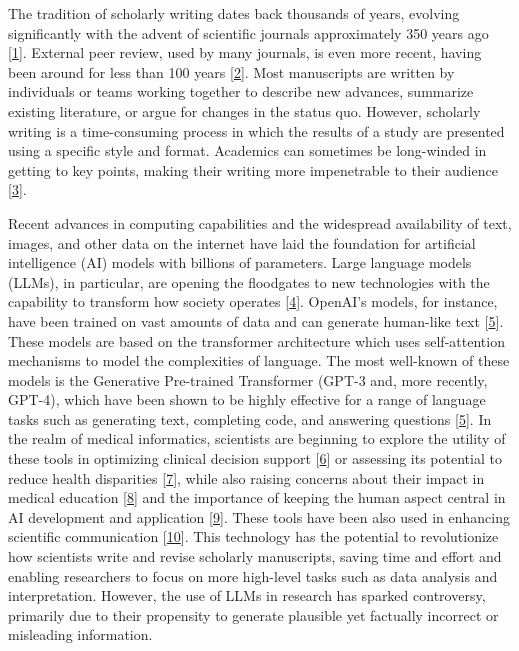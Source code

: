 \documentclass[
]{article}
\begin{document}
The tradition of scholarly writing dates back thousands of years, evolving significantly with the advent of scientific journals approximately 350 years ago {[}\protect\hyperlink{ref-F3iZfGUC}{1}{]}.
External peer review, used by many journals, is even more recent, having been around for less than 100 years {[}\protect\hyperlink{ref-1HMhNrQq1}{2}{]}.
Most manuscripts are written by individuals or teams working together to describe new advances, summarize existing literature, or argue for changes in the status quo.
However, scholarly writing is a time-consuming process in which the results of a study are presented using a specific style and format.
Academics can sometimes be long-winded in getting to key points, making their writing more impenetrable to their audience {[}\protect\hyperlink{ref-19YWsShi0}{3}{]}.

Recent advances in computing capabilities and the widespread availability of text, images, and other data on the internet have laid the foundation for artificial intelligence (AI) models with billions of parameters.
Large language models (LLMs), in particular, are opening the floodgates to new technologies with the capability to transform how society operates {[}\protect\hyperlink{ref-xq1uEbPa}{4}{]}.
OpenAI's models, for instance, have been trained on vast amounts of data and can generate human-like text {[}\protect\hyperlink{ref-bYOaJHMe}{5}{]}.
These models are based on the transformer architecture which uses self-attention mechanisms to model the complexities of language.
The most well-known of these models is the Generative Pre-trained Transformer (GPT-3 and, more recently, GPT-4), which have been shown to be highly effective for a range of language tasks such as generating text, completing code, and answering questions {[}\protect\hyperlink{ref-bYOaJHMe}{5}{]}.
In the realm of medical informatics, scientists are beginning to explore the utility of these tools in optimizing clinical decision support {[}\protect\hyperlink{ref-gRhoGuC4}{6}{]} or assessing its potential to reduce health disparities {[}\protect\hyperlink{ref-CYB5vhZp}{7}{]}, while also raising concerns about their impact in medical education {[}\protect\hyperlink{ref-h8wInPLE}{8}{]} and the importance of keeping the human aspect central in AI development and application {[}\protect\hyperlink{ref-Z2ek25Ak}{9}{]}.
These tools have been also used in enhancing scientific communication {[}\protect\hyperlink{ref-Svww2RUh}{10}{]}.
This technology has the potential to revolutionize how scientists write and revise scholarly manuscripts, saving time and effort and enabling researchers to focus on more high-level tasks such as data analysis and interpretation.
However, the use of LLMs in research has sparked controversy, primarily due to their propensity to generate plausible yet factually incorrect or misleading information.
\end{document}

